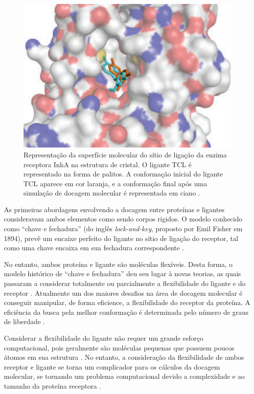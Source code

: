 \begin{figure}[h]
	\center
	\includegraphics[scale=0.60]{images/TCLdocking.png}
	\caption{Representação da superfície molecular do sítio de ligação da enzima receptora InhA na estrutura de cristal. O ligante TCL é  representado na forma de palitos. A conformação inicial do ligante TCL aparece em cor laranja, e a conformação final após uma simulação de docagem molecular é representada em ciano \cite{REN13}.}
	\label{fig:tcldock}
\end{figure}

As primeiras abordagens envolvendo a docagem entre proteínas e ligantes consideravam ambos elementos como sendo corpos rígidos. O modelo conhecido como ``chave e fechadura'' (do inglês \emph{lock-and-key}, proposto por Emil Fisher em 1894), prevê um encaixe perfeito do ligante no sítio de ligação do receptor, tal como uma chave encaixa em sua fechadura correspondente \cite{kar07}. 

No entanto, ambos proteína e ligante são moléculas flexíveis. Desta forma, o modelo histórico de ``chave e fechadura'' deu seu lugar à novas teorias, as quais passaram a considerar totalmente ou parcialmente a flexibilidade do ligante e do receptor \cite{SOU06}. Atualmente um dos maiores desafios na área de docagem molecular é conseguir manipular, de forma eficience, a flexibilidade do receptor da proteína. A eficiência da busca pela melhor conformação é determinada pelo número de graus de liberdade  \cite{SOU06}. 

Considerar a flexibilidade do ligante não requer um grande esforço computacional, pois geralmente são moléculas pequenas que possuem poucos átomos em sua estrutura \cite{COH10}. No entanto, a consideração da flexibilidade de ambos receptor e ligante se torna um complicador para os cálculos da docagem molecular, se tornando um problema computacional devido a complexidade e ao tamanho da proteína receptora \cite{art08}.

